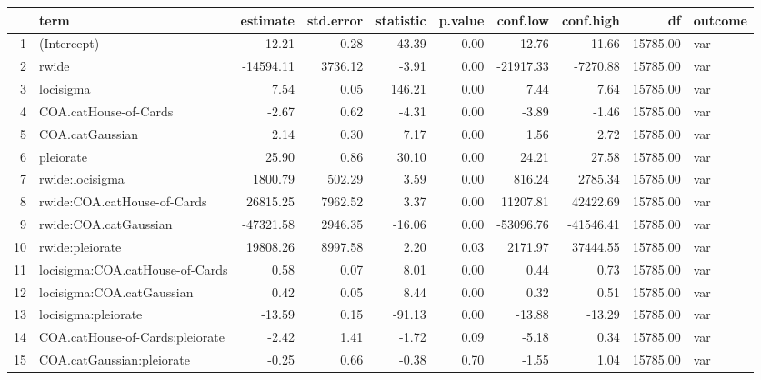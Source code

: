 \begin{table}[ht]
\centering
\begin{tabular}{rlrrrrrrrl}
  \hline
 & term & estimate & std.error & statistic & p.value & conf.low & conf.high & df & outcome \\ 
  \hline
1 & (Intercept) & -12.21 & 0.28 & -43.39 & 0.00 & -12.76 & -11.66 & 15785.00 & var \\ 
  2 & rwide & -14594.11 & 3736.12 & -3.91 & 0.00 & -21917.33 & -7270.88 & 15785.00 & var \\ 
  3 & locisigma & 7.54 & 0.05 & 146.21 & 0.00 & 7.44 & 7.64 & 15785.00 & var \\ 
  4 & COA.catHouse-of-Cards & -2.67 & 0.62 & -4.31 & 0.00 & -3.89 & -1.46 & 15785.00 & var \\ 
  5 & COA.catGaussian & 2.14 & 0.30 & 7.17 & 0.00 & 1.56 & 2.72 & 15785.00 & var \\ 
  6 & pleiorate & 25.90 & 0.86 & 30.10 & 0.00 & 24.21 & 27.58 & 15785.00 & var \\ 
  7 & rwide:locisigma & 1800.79 & 502.29 & 3.59 & 0.00 & 816.24 & 2785.34 & 15785.00 & var \\ 
  8 & rwide:COA.catHouse-of-Cards & 26815.25 & 7962.52 & 3.37 & 0.00 & 11207.81 & 42422.69 & 15785.00 & var \\ 
  9 & rwide:COA.catGaussian & -47321.58 & 2946.35 & -16.06 & 0.00 & -53096.76 & -41546.41 & 15785.00 & var \\ 
  10 & rwide:pleiorate & 19808.26 & 8997.58 & 2.20 & 0.03 & 2171.97 & 37444.55 & 15785.00 & var \\ 
  11 & locisigma:COA.catHouse-of-Cards & 0.58 & 0.07 & 8.01 & 0.00 & 0.44 & 0.73 & 15785.00 & var \\ 
  12 & locisigma:COA.catGaussian & 0.42 & 0.05 & 8.44 & 0.00 & 0.32 & 0.51 & 15785.00 & var \\ 
  13 & locisigma:pleiorate & -13.59 & 0.15 & -91.13 & 0.00 & -13.88 & -13.29 & 15785.00 & var \\ 
  14 & COA.catHouse-of-Cards:pleiorate & -2.42 & 1.41 & -1.72 & 0.09 & -5.18 & 0.34 & 15785.00 & var \\ 
  15 & COA.catGaussian:pleiorate & -0.25 & 0.66 & -0.38 & 0.70 & -1.55 & 1.04 & 15785.00 & var \\ 
   \hline
\end{tabular}
\end{table}
